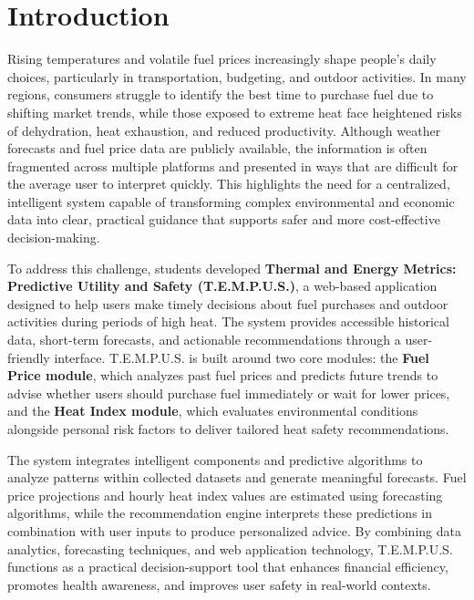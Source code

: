 \documentclass[12pt]{article}
\begin{document}
\section{Introduction}

Rising temperatures and volatile fuel prices increasingly shape people's daily choices, particularly in transportation, budgeting, and outdoor activities. In many regions, consumers struggle to identify the best time to purchase fuel due to shifting market trends, while those exposed to extreme heat face heightened risks of dehydration, heat exhaustion, and reduced productivity. Although weather forecasts and fuel price data are publicly available, the information is often fragmented across multiple platforms and presented in ways that are difficult for the average user to interpret quickly. This highlights the need for a centralized, intelligent system capable of transforming complex environmental and economic data into clear, practical guidance that supports safer and more cost-effective decision-making.

To address this challenge, students developed \textbf{Thermal and Energy Metrics: Predictive Utility and Safety (T.E.M.P.U.S.)}, a web-based application designed to help users make timely decisions about fuel purchases and outdoor activities during periods of high heat. The system provides accessible historical data, short-term forecasts, and actionable recommendations through a user-friendly interface. T.E.M.P.U.S. is built around two core modules: the \textbf{Fuel Price module}, which analyzes past fuel prices and predicts future trends to advise whether users should purchase fuel immediately or wait for lower prices, and the \textbf{Heat Index module}, which evaluates environmental conditions alongside personal risk factors to deliver tailored heat safety recommendations.

The system integrates intelligent components and predictive algorithms to analyze patterns within collected datasets and generate meaningful forecasts. Fuel price projections and hourly heat index values are estimated using forecasting algorithms, while the recommendation engine interprets these predictions in combination with user inputs to produce personalized advice. By combining data analytics, forecasting techniques, and web application technology, T.E.M.P.U.S. functions as a practical decision-support tool that enhances financial efficiency, promotes health awareness, and improves user safety in real-world contexts.
\end{document}
